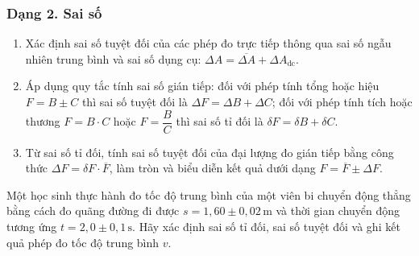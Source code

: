 \subsubsection{Dạng 2. Sai số}
\begin{phuongphap}
\begin{enumerate}
\item Xác định sai số tuyệt đối của các phép đo trực tiếp thông qua sai số ngẫu nhiên trung bình và sai số dụng cụ: $\Delta A = \overline{\Delta A} + \Delta A_{\text{dc}}$.
\item Áp dụng quy tắc tính sai số gián tiếp: đối với phép tính tổng hoặc hiệu $F = B \pm C$ thì sai số tuyệt đối là $\Delta F = \Delta B + \Delta C$; đối với phép tính tích hoặc thương $F = B \cdot C$ hoặc $F = \dfrac{B}{C}$ thì sai số tỉ đối là $\delta F = \delta B + \delta C$.
\item Từ sai số tỉ đối, tính sai số tuyệt đối của đại lượng đo gián tiếp bằng công thức $\Delta F = \delta F \cdot \overline{F}$, làm tròn và biểu diễn kết quả dưới dạng $F = \overline{F} \pm \Delta F$.
\end{enumerate}
\end{phuongphap}
\begin{vidumau}
Một học sinh thực hành đo tốc độ trung bình của một viên bi chuyển động thẳng bằng cách đo quãng đường đi được $s = 1,60 \pm 0,02\,\mathrm{m}$ và thời gian chuyển động tương ứng $t = 2,0 \pm 0,1\,\mathrm{s}$. Hãy xác định sai số tỉ đối, sai số tuyệt đối và ghi kết quả phép đo tốc độ trung bình $v$.
\end{vidumau}

